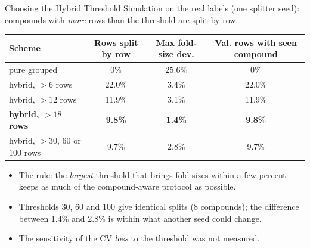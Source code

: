\documentclass[aspectratio=169,10pt]{beamer}
\begin{document}
\begin{frame}{Choosing the Hybrid Threshold}
\small
Simulation on the real labels (one splitter seed): compounds with \emph{more} rows than the threshold are split by row.
\vspace{0.3em}

\centering
\begin{tabular}{lccc}
\toprule
\textbf{Scheme} & \textbf{Rows split by row} & \textbf{Max fold-size dev.} & \textbf{Val. rows with seen compound}\\
\midrule
pure grouped & 0\% & 25.6\% & 0\%\\
hybrid, $>6$ rows & 22.0\% & 3.4\% & 22.0\%\\
hybrid, $>12$ rows & 11.9\% & 3.1\% & 11.9\%\\
\textbf{hybrid, $>18$ rows} & \textbf{9.8\%} & \textbf{1.4\%} & \textbf{9.8\%}\\
hybrid, $>30$, $60$ or $100$ rows & 9.7\% & 2.8\% & 9.7\%\\
\bottomrule
\end{tabular}

\vspace{0.5em}
\raggedright
\begin{itemize}
  \item The rule: the \emph{largest} threshold that brings fold sizes within a few percent keeps as much of the compound-aware protocol as possible.
  \item Thresholds 30, 60 and 100 give identical splits (8 compounds); the difference between 1.4\% and 2.8\% is within what another seed could change.
  \item The sensitivity of the CV \emph{loss} to the threshold was not measured.
\end{itemize}
\end{frame}
\end{document}
